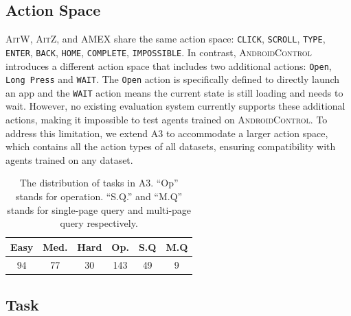 \documentclass[11pt]{article}
\begin{document}
\subsection{Action Space}

\textsc{AitW}, \textsc{AitZ}, and AMEX share the same action space: {\texttt{CLICK}, \texttt{SCROLL}, \texttt{TYPE}, \texttt{ENTER}, \texttt{BACK}, \texttt{HOME}, \texttt{COMPLETE}, \texttt{IMPOSSIBLE}}. In contrast, \textsc{AndroidControl} introduces a different action space that includes two additional actions: \texttt{Open}, \texttt{Long Press} and \texttt{WAIT}. The \texttt{Open} action is specifically defined to directly launch an app and the \texttt{WAIT} action means the current state is still loading and needs to wait. However, no existing evaluation system currently supports these additional actions, making it impossible to test agents trained on \textsc{AndroidControl}. To address this limitation, we extend A3 to accommodate a larger action space, which contains all the action types of all datasets, ensuring compatibility with agents trained on any dataset.

\begin{table}[t]
    \centering
    \begin{tabular}{c c c | c c c}
        \toprule
        Easy & Med. & Hard & Op. & S.Q & M.Q \\
        \midrule
        94 & 77 & 30 & 143 & 49 & 9 \\
        \bottomrule
    \end{tabular}
    \caption{The distribution of tasks in A3. ``Op'' stands for operation. ``S.Q.'' and ``M.Q'' stands for single-page query and multi-page query respectively. }
    \label{tab:distribution}
\end{table}

\subsection{Task}
\end{document}

